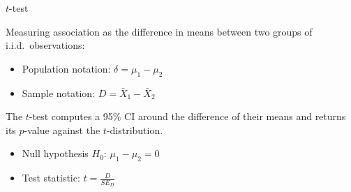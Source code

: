 \documentclass[t]{beamer}
\begin{document}
  \begin{frame}{$t$-test}
    
    \begin{block}{Measuring association as the difference in means between two groups of i.i.d.~observations:}
    
      \begin{itemize}
        \item Population notation:
        $\delta = \mu_1 - \mu_2$

        \item Sample notation:
        $D = \bar X_1 - \bar X_2$
      \end{itemize}

    \end{block}
    
    \begin{block}{The $t$-test computes a 95\% CI around the difference of their means and returns its $p$-value against the $t$-distribution.}
    
      \begin{itemize}
        \item Null hypothesis $H_0$:
        $\mu_1 - \mu_2 = 0$
      
        \item Test statistic:
        $t = \frac{D}{SE_D}$
      \end{itemize}

    \end{block}
    
  \end{frame}
  
\end{document}
